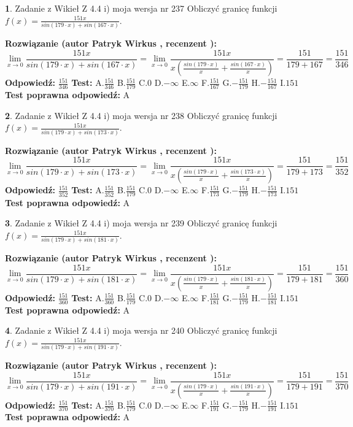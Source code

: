 \documentclass[12pt, a4paper]{article}
\theoremstyle{definition} %
\newtheorem{zad}{}
\newcommand{\zadStart}[1]{\begin{zad}#1\newline}
\newcommand{\zadStop}{\end{zad}}
\newcommand{\rozwStart}[2]{\noindent \textbf{Rozwiązanie (autor #1 , recenzent #2): }\newline}
\newcommand{\rozwStop}{\newline}
\newcommand{\odpStart}{\noindent \textbf{Odpowiedź:}\newline}
\newcommand{\odpStop}{\newline}
\newcommand{\testStart}{\noindent \textbf{Test:}\newline}
\newcommand{\testStop}{\newline}
\newcommand{\kluczStart}{\noindent \textbf{Test poprawna odpowiedź:}\newline}
\newcommand{\kluczStop}{\newline}
\begin{document}
\zadStart{Zadanie z Wikieł Z 4.4 i) moja wersja nr 237}
Obliczyć granicę funkcji $f(x)=\frac{151x}{sin(179\cdot x) +sin(167\cdot x)}$.
\zadStop
\rozwStart{Patryk Wirkus}{}
$$\lim\limits_{x\to 0}\frac{151x}{sin(179\cdot x) +sin(167\cdot x)}=\lim\limits_{x\to 0}\frac{151x}{x(\frac{sin(179\cdot x)}{x}+\frac{sin(167\cdot x)}{x})}=\frac{151}{179+167} = \frac{151}{346}$$
\rozwStop
\odpStart
$\frac{151}{346}$
\odpStop
\testStart
A.$\frac{151}{346}$
B.$\frac{151}{179}$
C.$0$
D.$-\infty$
E.$\infty$
F.$\frac{151}{167}$
G.$-\frac{151}{179}$
H.$-\frac{151}{167}$
I.$151$
\testStop
\kluczStart
A
\kluczStop



\zadStart{Zadanie z Wikieł Z 4.4 i) moja wersja nr 238}
Obliczyć granicę funkcji $f(x)=\frac{151x}{sin(179\cdot x) +sin(173\cdot x)}$.
\zadStop
\rozwStart{Patryk Wirkus}{}
$$\lim\limits_{x\to 0}\frac{151x}{sin(179\cdot x) +sin(173\cdot x)}=\lim\limits_{x\to 0}\frac{151x}{x(\frac{sin(179\cdot x)}{x}+\frac{sin(173\cdot x)}{x})}=\frac{151}{179+173} = \frac{151}{352}$$
\rozwStop
\odpStart
$\frac{151}{352}$
\odpStop
\testStart
A.$\frac{151}{352}$
B.$\frac{151}{179}$
C.$0$
D.$-\infty$
E.$\infty$
F.$\frac{151}{173}$
G.$-\frac{151}{179}$
H.$-\frac{151}{173}$
I.$151$
\testStop
\kluczStart
A
\kluczStop



\zadStart{Zadanie z Wikieł Z 4.4 i) moja wersja nr 239}
Obliczyć granicę funkcji $f(x)=\frac{151x}{sin(179\cdot x) +sin(181\cdot x)}$.
\zadStop
\rozwStart{Patryk Wirkus}{}
$$\lim\limits_{x\to 0}\frac{151x}{sin(179\cdot x) +sin(181\cdot x)}=\lim\limits_{x\to 0}\frac{151x}{x(\frac{sin(179\cdot x)}{x}+\frac{sin(181\cdot x)}{x})}=\frac{151}{179+181} = \frac{151}{360}$$
\rozwStop
\odpStart
$\frac{151}{360}$
\odpStop
\testStart
A.$\frac{151}{360}$
B.$\frac{151}{179}$
C.$0$
D.$-\infty$
E.$\infty$
F.$\frac{151}{181}$
G.$-\frac{151}{179}$
H.$-\frac{151}{181}$
I.$151$
\testStop
\kluczStart
A
\kluczStop



\zadStart{Zadanie z Wikieł Z 4.4 i) moja wersja nr 240}
Obliczyć granicę funkcji $f(x)=\frac{151x}{sin(179\cdot x) +sin(191\cdot x)}$.
\zadStop
\rozwStart{Patryk Wirkus}{}
$$\lim\limits_{x\to 0}\frac{151x}{sin(179\cdot x) +sin(191\cdot x)}=\lim\limits_{x\to 0}\frac{151x}{x(\frac{sin(179\cdot x)}{x}+\frac{sin(191\cdot x)}{x})}=\frac{151}{179+191} = \frac{151}{370}$$
\rozwStop
\odpStart
$\frac{151}{370}$
\odpStop
\testStart
A.$\frac{151}{370}$
B.$\frac{151}{179}$
C.$0$
D.$-\infty$
E.$\infty$
F.$\frac{151}{191}$
G.$-\frac{151}{179}$
H.$-\frac{151}{191}$
I.$151$
\testStop
\kluczStart
A
\kluczStop
\end{document}
